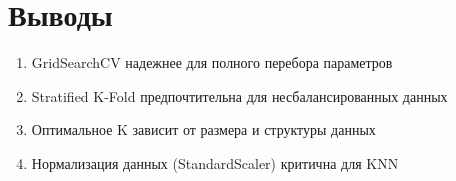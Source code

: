 \documentclass[a4paper,12pt]{article}
\begin{document}
\section*{Выводы}

\begin{enumerate}
    \item GridSearchCV надежнее для полного перебора параметров
    \item Stratified K-Fold предпочтительна для несбалансированных данных
    \item Оптимальное K зависит от размера и структуры данных
    \item Нормализация данных (StandardScaler) критична для KNN
\end{enumerate}
\end{document}
